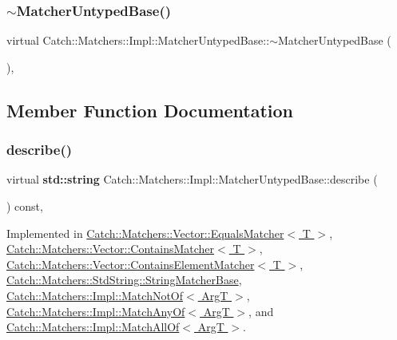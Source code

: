 \subsubsection{\texorpdfstring{$\sim$\+Matcher\+Untyped\+Base()}{~MatcherUntypedBase()}}
{\footnotesize\ttfamily virtual Catch\+::\+Matchers\+::\+Impl\+::\+Matcher\+Untyped\+Base\+::$\sim$\+Matcher\+Untyped\+Base (\begin{DoxyParamCaption}{ }\end{DoxyParamCaption})\hspace{0.3cm}{\ttfamily [protected]}, {\ttfamily [virtual]}}



\subsection{Member Function Documentation}
\mbox{\label{class_catch_1_1_matchers_1_1_impl_1_1_matcher_untyped_base_a91d3a907dbfcbb596077df24f6e11fe2}} 
\subsubsection{\texorpdfstring{describe()}{describe()}}
{\footnotesize\ttfamily virtual \textbf{ std\+::string} Catch\+::\+Matchers\+::\+Impl\+::\+Matcher\+Untyped\+Base\+::describe (\begin{DoxyParamCaption}{ }\end{DoxyParamCaption}) const\hspace{0.3cm}{\ttfamily [protected]}, {}}



Implemented in \hyperlink{struct_catch_1_1_matchers_1_1_vector_1_1_equals_matcher_aca79ade26f4a75b2a57005067e086e35}{Catch\+::\+Matchers\+::\+Vector\+::\+Equals\+Matcher$<$ T $>$}, \hyperlink{struct_catch_1_1_matchers_1_1_vector_1_1_contains_matcher_add1a31f049cec89f980424ecdb7027ac}{Catch\+::\+Matchers\+::\+Vector\+::\+Contains\+Matcher$<$ T $>$}, \hyperlink{struct_catch_1_1_matchers_1_1_vector_1_1_contains_element_matcher_a5a869772714dd045816707b74b217664}{Catch\+::\+Matchers\+::\+Vector\+::\+Contains\+Element\+Matcher$<$ T $>$}, \hyperlink{struct_catch_1_1_matchers_1_1_std_string_1_1_string_matcher_base_a9d15cfb882efbea778b2ed29e7f48f37}{Catch\+::\+Matchers\+::\+Std\+String\+::\+String\+Matcher\+Base}, \hyperlink{struct_catch_1_1_matchers_1_1_impl_1_1_match_not_of_a62bdc7dcb9ff000438a4ed3d5483a248}{Catch\+::\+Matchers\+::\+Impl\+::\+Match\+Not\+Of$<$ Arg\+T $>$}, \hyperlink{struct_catch_1_1_matchers_1_1_impl_1_1_match_any_of_a020f5d7889d8cd8be9ad309c690147b6}{Catch\+::\+Matchers\+::\+Impl\+::\+Match\+Any\+Of$<$ Arg\+T $>$}, and \hyperlink{struct_catch_1_1_matchers_1_1_impl_1_1_match_all_of_aaefeba99a0b35425203468a65bff544b}{Catch\+::\+Matchers\+::\+Impl\+::\+Match\+All\+Of$<$ Arg\+T $>$}.

